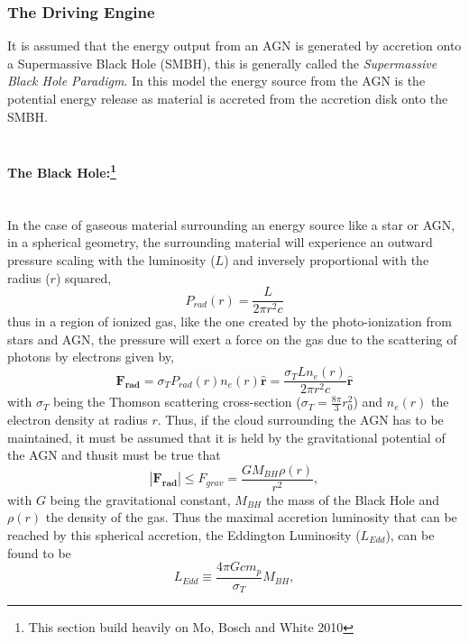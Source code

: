 \documentclass[a4paper, 12pt, twoside]{article}
\begin{document}
\subsubsection{The Driving Engine}
It is assumed that the energy output from an AGN is generated by accretion onto a Supermassive Black Hole (SMBH), this is generally called the \emph{Supermassive Black Hole Paradigm}. In this model the energy source from the AGN is the potential energy release as material is accreted from the accretion disk onto the SMBH. \\
\\
\paragraph[The Black Hole:]{The Black Hole:\footnote{This section build heavily on Mo, Bosch and White 2010}}\mbox{}\\
In the case of gaseous material surrounding an energy source like a star or AGN, in a spherical geometry, the surrounding material will experience an outward pressure scaling with the luminosity ($L$) and inversely proportional with the radius ($r$) squared,
\begin{equation}
P_{rad}(r) = \frac{L} {2\pi r^{2}c}
\label{eq:P_rad}
\end{equation}
thus in a region of ionized gas, like the one created by the photo-ionization from stars and AGN, the pressure will exert a force on the gas due to the scattering of photons by electrons given by,
\begin{equation}
\mathbf{F_{rad}} = \sigma_{T}P_{rad}(r)n_{e}(r) \mathbf{\hat{r}} = \frac{\sigma_{T}Ln_{e}(r)}{2\pi r^{2}c}\mathbf{\hat{r}}
\label{eq:F_rad}
\end{equation}
with $\sigma_{T}$ being the Thomson scattering cross-section ($\sigma_{T} = \frac{8\pi}{3}r_{0}^{2}$) and $n_{e}(r)$ the electron density at radius $r$. Thus, if the cloud surrounding the AGN has to be maintained, it must be assumed that it is held by the gravitational potential of the AGN and thusit must be true that
\begin{equation}
|\mathbf{F_{rad}}| \le F_{grav} = \frac{GM_{BH}\rho(r)} {r^{2}},
\label{eq:F_grav}
\end{equation}
with $G$ being the gravitational constant, $M_{BH}$ the mass of the Black Hole and $\rho(r)$ the density of the gas. Thus the maximal accretion luminosity that can be reached by this spherical accretion, the Eddington Luminosity ($L_{Edd}$), can be found to be
\begin{equation}
L_{Edd} \equiv \frac{4\pi Gcm_{p}}{\sigma_{T}}M_{BH},
\label{eq:L_Edd}
\end{equation}
\end{document}
